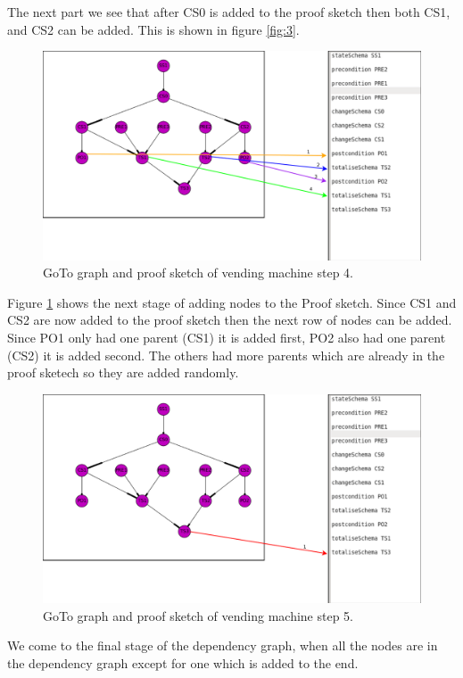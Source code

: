 The next part we see that after CS0 is added to the proof sketch then both
CS1, and CS2 can be added. This is shown in figure \ref{fig:3}.

\begin{figure}[H]
\includegraphics[scale=0.3]{Figures/skeleton/4.png}
\caption{GoTo graph and proof sketch of vending machine step 4.}
\label{fig:4}
\end{figure}

Figure \ref{fig:4} shows the next stage of adding nodes to the Proof sketch.
Since CS1 and CS2 are now added to the proof sketch then the next row of nodes
can be added. Since PO1 only had one parent (CS1) it is added first, PO2 also
had one parent (CS2) it is added second. The others had more parents which are
already in the proof sketech so they are added randomly.

\begin{figure}[H]
\includegraphics[scale=0.3]{Figures/skeleton/5.png}
\caption{GoTo graph and proof sketch of vending machine step 5.}
\label{fig:5}
\end{figure}

We come to the final stage of the dependency graph, when all the nodes are in
the dependency graph except for one which is added to the end.

